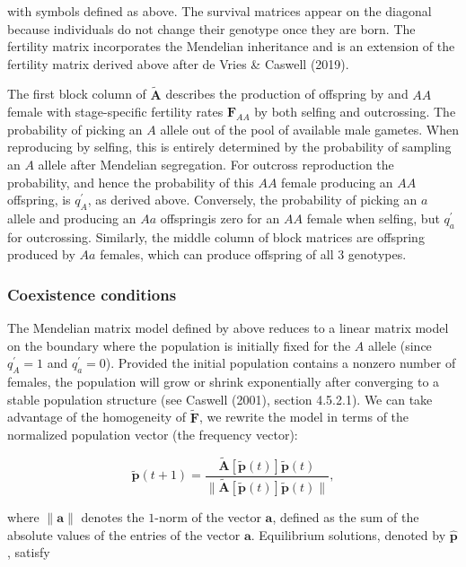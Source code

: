 \documentclass[11pt]{article}
\def\mbf#1{\mathbf{#1}}
\begin{document}
\noindent with symbols defined as above. The survival matrices appear on the diagonal because individuals do not change their genotype once they are born. The fertility matrix incorporates the Mendelian inheritance and is an extension of the fertility matrix derived above after de Vries \& Caswell (2019).

The first block column of $\tilde{\mbf{A}}$ describes the production of offspring by and $AA$ female with stage-specific fertility rates $\mbf{F}_{AA}$ by both selfing and outcrossing. The probability of picking an $A$ allele out of the pool of available male gametes. When reproducing by selfing, this is entirely determined by the probability of sampling an $A$ allele after Mendelian segregation. For outcross reproduction the probability, and hence the probability of this $AA$ female producing an $AA$ offspring, is $q^{\prime}_{A}$, as derived above. Conversely, the probability of picking an $a$ allele and producing an $Aa$ offspringis zero for an $AA$ female when selfing, but $q^{\prime}_a$ for outcrossing. Similarly, the middle column of block matrices are offspring produced by $Aa$ females, which can produce offspring of all $3$ genotypes.

\subsubsection*{Coexistence conditions}

The Mendelian matrix model defined by above reduces to a linear matrix model on the boundary where the population is initially fixed for the $A$ allele (since $q^{\prime}_{A} = 1$ and $q^{\prime}_{a} = 0$). Provided the initial population contains a nonzero number of females, the population will grow or shrink exponentially after converging to a stable population structure (see Caswell (2001), section 4.5.2.1). We can take advantage of the homogeneity of $\tilde{\mbf{F}}$, we rewrite the model in terms of the normalized population vector (the frequency vector):

\begin{equation} 
	\tilde{\mbf{p}}(t + 1) = \frac{ \tilde{\mbf{A}}[\tilde{\mbf{p}}(t)] \tilde{\mbf{p}}(t) }{ \| \tilde{\mbf{A}}[\tilde{\mbf{p}}(t)] \tilde{\mbf{p}}(t) \|},
\end{equation}

\noindent where $\| \mbf{a} \|$ denotes the $1$-norm of the vector $\mbf{a}$, defined as the sum of the absolute values of the entries of the vector $\mbf{a}$. Equilibrium solutions, denoted by $\hat{\mbf{p}}$, satisfy
\end{document}
